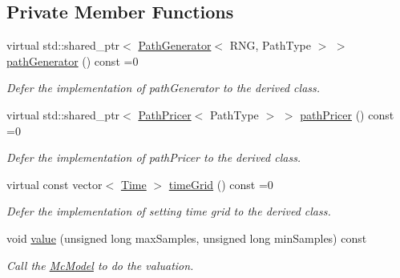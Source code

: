 \subsection*{Private Member Functions}
\begin{DoxyCompactItemize}
\item 
virtual std\+::shared\+\_\+ptr$<$ \hyperlink{class_path_generator}{Path\+Generator}$<$ R\+NG, Path\+Type $>$ $>$ \hyperlink{class_mc_simulation_afa7ba8d9b534837e7c62f47c6d20a353}{path\+Generator} () const =0
\begin{DoxyCompactList}\small\item\em Defer the implementation of path\+Generator to the derived class. \end{DoxyCompactList}\item 
virtual std\+::shared\+\_\+ptr$<$ \hyperlink{class_path_pricer}{Path\+Pricer}$<$ Path\+Type $>$ $>$ \hyperlink{class_mc_simulation_a64a3e635c1fa9d25797dc0cbad767238}{path\+Pricer} () const =0
\begin{DoxyCompactList}\small\item\em Defer the implementation of path\+Pricer to the derived class. \end{DoxyCompactList}\item 
virtual const vector$<$ \hyperlink{_name_def_8h_ac2d3e0ba793497bcca555c7c2cf64ff3}{Time} $>$ \hyperlink{class_mc_simulation_acf7d24981be3025a2cf07f8623dbe8ce}{time\+Grid} () const =0
\begin{DoxyCompactList}\small\item\em Defer the implementation of setting time grid to the derived class. \end{DoxyCompactList}\item 
void \hyperlink{class_mc_simulation_a0e5d11df4cca5b1f3dcdc8f528a9a56f}{value} (unsigned long max\+Samples, unsigned long min\+Samples) const
\begin{DoxyCompactList}\small\item\em Call the \hyperlink{class_mc_model}{Mc\+Model} to do the valuation. \end{DoxyCompactList}\end{DoxyCompactItemize}

